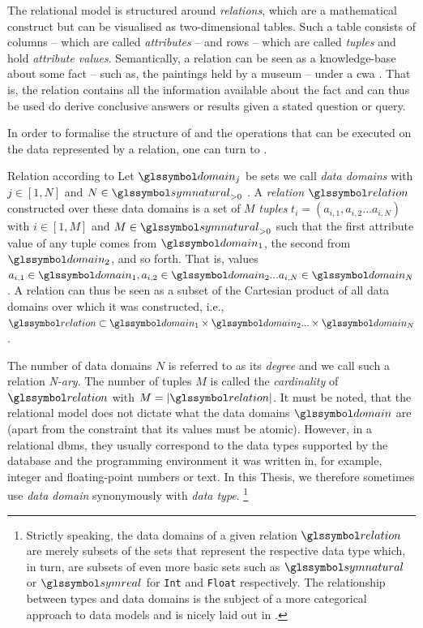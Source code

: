 The relational model is structured around \emph{relations}, which are a mathematical construct but can be visualised as two-dimensional tables. Such a table consists of columns -- which are called \emph{attributes} -- and rows -- which are called \emph{tuples} and hold \emph{attribute values}. Semantically, a relation can be seen as a knowledge-base about some fact -- such as, the paintings held by a museum -- under a \acrfull{cwa} \cite{Reiter:1981Closed}. That is, the relation contains all the information available about the fact and can thus be used do derive conclusive answers or results given a stated question or query.

In order to formalise the structure of and the operations that can be executed on the data represented by a relation, one can turn to . 

\begin{definition}[label=definition:relation]{Relation according to \cite{Codd:1970Relational}}{}
    Let $\domain_j$ be sets we call \emph{data domains} with $j \in \left[ 1, N \right]$ and $N \in \symnatural_{> 0}$ . A \emph{relation} $\relation$ constructed over these data domains is a set of $M$ \emph{tuples} $t_i = (a_{i,1}, a_{i,2} ... a_{i,N})$ with $i \in \left[ 1, M \right]$ and $M \in \symnatural_{> 0}$ such that the first attribute value of any tuple comes from $\domain_1$, the second from $\domain_2$, and so forth. That is, values $a_{i,1} \in \domain_1, a_{i,2} \in \domain_2 ... a_{i,N} \in \domain_N$. A relation can thus be seen as a subset of the Cartesian product of all data domains over which it was constructed, i.e., $\relation \subset \domain_1 \times \domain_2 ... \times \domain_N$.
\end{definition}

The number of data domains $N$ is referred to as its \emph{degree} and we call such a relation \emph{N-ary}. The number of tuples $M$ is called the \emph{cardinality} of $\relation$ with $M = |\relation|$. It must be noted, that the relational model does not dictate what the data domains $\domain$ are (apart from the constraint that its values must be atomic). However, in a relational \acrshort{dbms}, they usually correspond to the data types supported by the database and the programming environment it was written in, for example, integer and floating-point numbers or text. In this Thesis, we therefore sometimes use \emph{data domain} synonymously with \emph{data type}. \footnote{Strictly speaking, the data domains of a given relation $\relation$ are merely subsets of the sets that represent the respective data type which, in turn, are subsets of even more basic sets such as $\symnatural$ or $\symreal$ for \lstinline{Int} and \lstinline{Float} respectively. The relationship between types and data domains is the subject of a more categorical approach to data models and is nicely laid out in \cite{Spivak:2009Simplicial}.}

